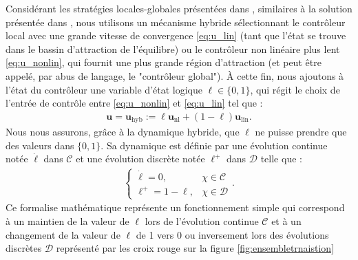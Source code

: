 Considérant les stratégies locales-globales présentées dans \cite[Ex. 1. 7]{65}, similaires à la solution présentée dans \cite{AndreettoFZ16}, nous utilisons un mécanisme hybride sélectionnant le contrôleur local avec une grande vitesse de convergence \eqref{eq:u_lin} (tant que l'état se trouve dans le bassin d'attraction de l'équilibre) ou le contrôleur non linéaire plus lent \eqref{eq:u_nonlin}, qui fournit une plus grande région d'attraction (et peut être appelé, par abus de langage, le "contrôleur global"). À cette fin, nous ajoutons à l'état du contrôleur une variable d'état logique $\ell \in \{0,1\}$, qui régit le choix de l'entrée de contrôle entre \eqref{eq:u_nonlin} et \eqref{eq:u_lin} tel que :
\begin{align}
\label{eq:u_hybrid}
  \boldsymbol{u}=\boldsymbol{u}_{\text{hyb}} := \ell \boldsymbol{u}_{\text{nl}} + (1-\ell) \boldsymbol{u}_{\text{lin}}.
\end{align}
Nous nous assurons, grâce à la dynamique hybride, que $\ell$ ne puisse prendre que des valeurs dans $\{0,1\}$. Sa dynamique est définie par une évolution continue notée $\dot \ell$ dans $\mathcal{C}$ et une évolution discrète notée $\ell^{+}$ dans $\mathcal{D}$ telle que : 
\begin{align}
    \left\{
        \begin{array}{ll}
            \dot \ell = 0,& \chi \in \mathcal{C}\\
            \ell^{+} = 1-\ell,& \chi \in \mathcal{D}
        \end{array}.
    \right.
\end{align}
Ce formalise mathématique représente un fonctionnement simple qui correspond à un maintien de la valeur de $\ell$ lors de l'évolution continue $\mathcal{C}$ et à un changement de la valeur de $\ell$ de 1 vers 0 ou inversement lors des évolutions discrètes $\mathcal{D}$ représenté par les croix rouge sur la figure \ref{fig:ensembletrnaistion}


